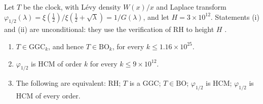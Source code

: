 \begin{theorem}\label{mw:thm:bondesson}
Let $T$ be the clock, with L\'evy density $W(x)/x$ and Laplace transform $\varphi_{1/2}(\lambda)=\xi(\tfrac12)/\xi(\tfrac12+\sqrt\lambda)=1/G(\lambda)$, and let $H=3\times10^{12}$. Statements (i) and (ii) are unconditional: they use the verification of RH to height $H$ \cite{PT21}.
\begin{enumerate}
\item[(i)] $T\in\mathrm{GGC}_k$, and hence $T\in\mathrm{BO}_k$, for every $k\leq1.16\times10^{25}$.
\item[(ii)] $\varphi_{1/2}$ is HCM of order $k$ for every $k\leq9\times10^{12}$.
\item[(iii)] The following are equivalent: RH; $T$ is a GGC; $T\in\mathrm{BO}$; $\varphi_{1/2}$ is HCM; $\varphi_{1/2}$ is HCM of every order.
\end{enumerate}
\end{theorem}

